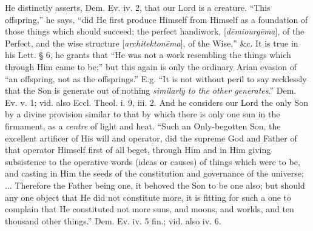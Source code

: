 He distinctly asserts, Dem. Ev. iv. 2, that our
Lord is a creature. ``This offspring,'' he says, ``did He first produce
Himself from Himself as a foundation of those things which should
succeed; the perfect handiwork, [\emph{d\={e}miourg\={e}ma}], of
the Perfect, and the wise structure [\emph{architekton\={e}ma}], of
the Wise,'' \&c. It is true in his Lett. § 6, he grants that ``He
was not a work resembling the things which through Him came to be;''
but this again is only the ordinary Arian evasion of ``an offspring,
not as the offsprings.'' E.g. ``It is not without peril to say
recklessly that the Son is generate out of nothing \emph{similarly
to the other generates}.'' Dem.
Ev. v. 1; vid. also Eccl. Theol. i. 9, iii. 2. And he considers our
Lord the only Son by a divine provision similar to that by which there
is only one sun in the firmament, as a \emph{centre}
of light and heat. ``Such an Only-begotten Son, the excellent
artificer of His will and operator, did the supreme God and Father of
that operator Himself first of all beget, through Him and in Him
giving subsistence to the operative words (ideas or causes) of things
which were to be, and casting in Him the seeds of the constitution and
governance of the universe; ... Therefore the Father being one, it
behoved the Son to be one also; but should any one object that He did
not constitute more, it is fitting for such a one to complain that He
constituted not more suns, and moons, and worlds, and ten thousand
other things.'' Dem. Ev. iv. 5
fin.; vid. also iv. 6.

